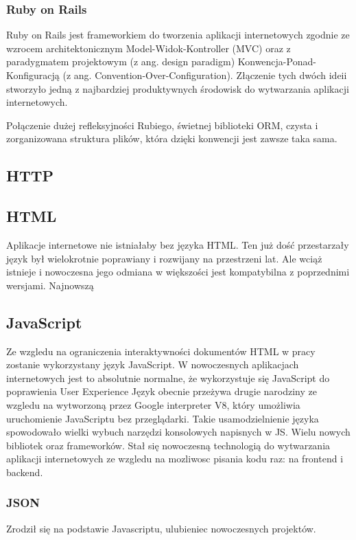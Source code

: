 \subsubsection{Ruby on Rails}
Ruby on Rails jest frameworkiem %
do tworzenia aplikacji internetowych zgodnie ze wzrocem architektonicznym Model-Widok-Kontroller (MVC) oraz z paradygmatem projektowym (z ang. design paradigm) Konwencja-Ponad-Konfiguracją (z ang. Convention-Over-Configuration). Złączenie tych dwóch ideii stworzyło jedną z najbardziej produktywnych środowisk do wytwarzania aplikacji internetowych.

Połączenie dużej refleksyjności Rubiego, świetnej biblioteki ORM, czysta i zorganizowana struktura plików, która dzięki konwencji jest zawsze taka sama.


\subsection{HTTP}
\subsection{HTML}
Aplikacje internetowe nie istniałaby bez języka HTML. Ten już dość przestarzały język był wielokrotnie poprawiany i rozwijany na przestrzeni lat. Ale wciąż istnieje i nowoczesna jego odmiana w większości jest kompatybilna z poprzednimi wersjami. Najnowszą 
\subsection{JavaScript}
Ze wzgledu na ograniczenia interaktywności dokumentów HTML w pracy zostanie wykorzystany język JavaScript. W nowoczesnych aplikacjach internetowych jest to absolutnie normalne, że wykorzystuje się JavaScript do poprawienia User Experience
Język obecnie przeżywa drugie narodziny ze wzgledu na wytworzoną przez Google interpreter V8, który umożliwia uruchomienie JavaScriptu bez przeglądarki. Takie usamodzielnienie języka spowodowało wielki wybuch narzędzi konsolowych napisnych w JS. Wielu nowych bibliotek oraz frameworków. Stał się nowoczesną technologią do wytwarzania aplikacji internetowych ze wzgledu na mozliwosc pisania kodu raz: na frontend i backend. %


\subsubsection{JSON}
Zrodził się na podstawie Javascriptu, ulubieniec nowoczesnych projektów.
